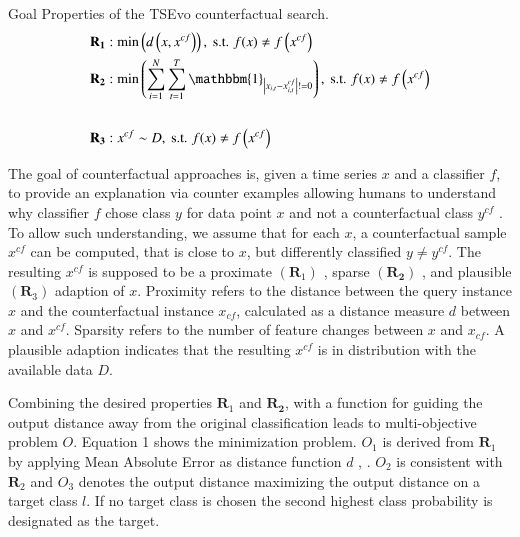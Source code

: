 \begin{definition}
Goal Properties of the TSEvo counterfactual search.
$$
\begin{aligned}
& \mathbf{R}_{\mathbf{1}}: \min \left(d\left(x, x^{c f}\right)\right), \text { s.t. } f(x) \neq f\left(x^{c f}\right) \\
& \mathbf{R}_{\mathbf{2}}: \min \left(\sum_{i=1}^{N} \sum_{t=1}^{T} \mathbbm{1}_{\left|x_{i, t}-x_{i, t}^{c f}\right| !=0}\right), \text { s.t. } f(x) \neq f\left(x^{c f}\right) \\
& \\
& \mathbf{R}_{\mathbf{3}}: x^{c f} \sim D, \text { s.t. } f(x) \neq f\left(x^{c f}\right)
\end{aligned}
$$ 
\end{definition}
The goal of counterfactual approaches is, given a time series $x$ and a classifier $f$, to provide an explanation via counter examples allowing humans to understand why classifier $f$ chose class $y$ for data point $x$ and not a counterfactual class $y^{c f}$ \cite{wachter_counterfactual_2018}. To allow such understanding, we assume that for each $x$, a counterfactual sample $x^{c f}$ can be computed, that is close to $x$, but differently classified $y \neq y^{c f}$. The resulting $x^{c f}$ is supposed to be a proximate $\left(\mathbf{R}_{1}\right)$ \cite{mothilal_explaining_2020}, sparse $\left(\mathbf{R}_{\mathbf{2}}\right)$ \cite{mothilal_explaining_2020}, and plausible $\left(\mathbf{R}_{3}\right)$ \cite{laugel_dangers_2019} adaption of $x$. Proximity refers to the distance between the query instance $x$ and the counterfactual instance $x_{c f}$, calculated as a distance measure $d$ between $x$ and $x^{c f}$. Sparsity refers to the number of feature changes between $x$ and $x_{c f}$. A plausible adaption indicates that the resulting $x^{c f}$ is in distribution with the available data $D$.

Combining the desired properties $\mathbf{R}_{1}$ and $\mathbf{R}_{\mathbf{2}}$, with a function for guiding the output distance away from the original classification leads to multi-objective problem $O$. Equation 1 shows the minimization problem. $O_{1}$ is derived from $\mathbf{R}_{1}$ by applying Mean Absolute Error as distance function $d$ \cite{mothilal_explaining_2020}, \cite{wachter_counterfactual_2018}. $O_{2}$ is consistent with $\mathbf{R}_{2}$ and $O_{3}$ denotes the output distance maximizing the output distance on a target class $l$. If no target class is chosen the second highest class probability is designated as the target.

